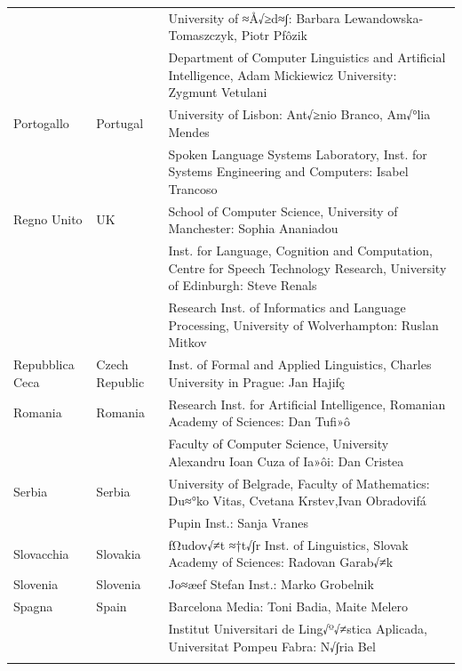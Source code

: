 \begin{longtable}{llp{110mm}}
  & & University of ≈Å√≥d≈∫: Barbara Lewandowska-Tomaszczyk, Piotr Pƒôzik\\ \addlinespace
  & & Department of Computer Linguistics and Artificial Intelligence, Adam Mickiewicz University: Zygmunt Vetulani \\ \addlinespace
  Portogallo & \textcolor{grey1}{Portugal} & University of Lisbon: Ant√≥nio Branco, Am√°lia Mendes \\ \addlinespace
  & & Spoken Language Systems Laboratory, Inst. for Systems Engineering and Computers: Isabel Trancoso \\ \addlinespace
  Regno Unito & \textcolor{grey1}{UK} & 
  School of Computer Science, University of Manchester: Sophia Ananiadou \\ \addlinespace 
  & & Inst. for Language, Cognition and Computation, Centre for Speech Technology Research, University of Edinburgh: Steve Renals \\ \addlinespace 
  & & Research Inst. of Informatics and Language Processing, University of Wolverhampton: Ruslan Mitkov \\ \addlinespace 
  Repubblica Ceca & \textcolor{grey1}{Czech Republic} & Inst. of Formal and Applied Linguistics, Charles University in Prague: Jan Hajiƒç \\ \addlinespace
  Romania & \textcolor{grey1}{Romania} & Research Inst. for Artificial Intelligence, Romanian Academy of Sciences: Dan Tufi»ô \\ \addlinespace
  & & Faculty of Computer Science, University Alexandru Ioan Cuza of Ia»ôi: Dan Cristea \\ \addlinespace
  Serbia & \textcolor{grey1}{Serbia} & University of Belgrade, Faculty of Mathematics: Du≈°ko Vitas, Cvetana Krstev,\newline Ivan Obradoviƒá \\ \addlinespace
  & & Pupin Inst.: Sanja Vranes \\ \addlinespace  
  Slovacchia & \textcolor{grey1}{Slovakia} &  ƒΩudov√≠t ≈†t√∫r Inst. of Linguistics, Slovak Academy of Sciences: Radovan Garab√≠k \\ \addlinespace 
  Slovenia & \textcolor{grey1}{Slovenia} & Jo≈æef Stefan Inst.: Marko Grobelnik \\ \addlinespace 
  Spagna & \textcolor{grey1}{Spain} & Barcelona Media: Toni Badia, Maite Melero \\ \addlinespace 
  & & Institut Universitari de Ling√º√≠stica Aplicada, Universitat Pompeu Fabra: N√∫ria Bel \\ \addlinespace 

\end{longtable}
